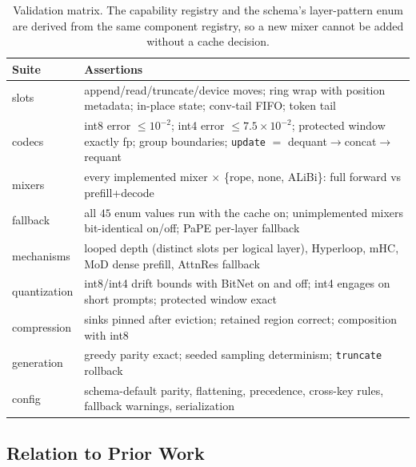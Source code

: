 \begin{table}[H]
\centering
\small
\begin{tabularx}{0.98\linewidth}{l X}
\toprule
\textbf{Suite} & \textbf{Assertions} \\
\midrule
slots & append/read/truncate/device moves; ring wrap with position metadata; in-place state; conv-tail FIFO; token tail \\
codecs & int8 error $\le 10^{-2}$; int4 error $\le 7.5\times10^{-2}$; protected window exactly fp; group boundaries; \texttt{update} $=$ dequant$\to$concat$\to$requant \\
mixers & every implemented mixer $\times$ \{rope, none, ALiBi\}: full forward vs prefill+decode \\
fallback & all $45$ enum values run with the cache on; unimplemented mixers bit-identical on/off; PaPE per-layer fallback \\
mechanisms & looped depth (distinct slots per logical layer), Hyperloop, mHC, MoD dense prefill, AttnRes fallback \\
quantization & int8/int4 drift bounds with BitNet on and off; int4 engages on short prompts; protected window exact \\
compression & sinks pinned after eviction; retained region correct; composition with int8 \\
generation & greedy parity exact; seeded sampling determinism; \texttt{truncate} rollback \\
config & schema-default parity, flattening, precedence, cross-key rules, fallback warnings, serialization \\
\bottomrule
\end{tabularx}
\caption{Validation matrix. The capability registry and the schema's layer-pattern enum are derived from the same component registry, so a new mixer cannot be added without a cache decision.}
\label{tab:kv-tests}
\end{table}

\subsection{Relation to Prior Work}

